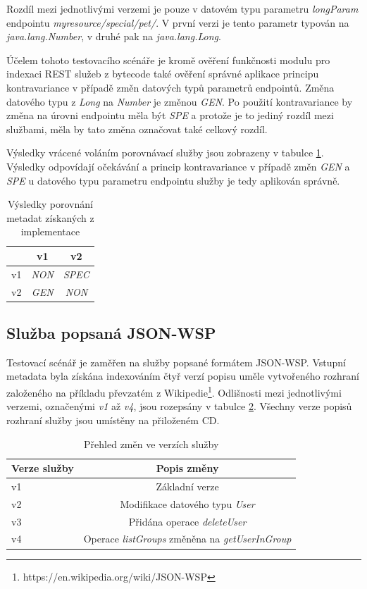 \documentclass[czech,DP]{thesiskiv}
\begin{document}
Rozdíl mezi jednotlivými verzemi je pouze v datovém typu parametru \textit{longParam} endpointu \textit{myresource/special/pet/}. V první verzi je tento parametr typován na \textit{java.lang.Number}, v druhé pak na \textit{java.lang.Long}.

Účelem tohoto testovacího scénáře je kromě ověření funkčnosti modulu pro indexaci REST služeb z bytecode také ověření správné aplikace principu kontravariance v případě změn datových typů parametrů endpointů. Změna datového typu z \textit{Long} na \textit{Number} je změnou \textit{GEN}. Po použití kontravariance by změna na úrovni endpointu měla být \textit{SPE} a protože je to jediný rozdíl mezi službami, měla by tato změna označovat také celkový rozdíl.

Výsledky vrácené voláním porovnávací služby jsou zobrazeny v tabulce \ref{tab:jersey-cmp-res}. Výsledky odpovídají očekávání a princip kontravariance v případě změn \textit{GEN} a \textit{SPE} u datového typu parametru endpointu služby je tedy aplikován správně.

\begin{table}[h]
	\centering
	\begin{tabular}{|l||c|c|}
		\hline
		& v1 & v2 \\
		\hline
		\hline
		v1 & \textit{NON} & \textit{SPEC} \\
		\hline
		v2 & \textit{GEN} & \textit{NON} \\
		\hline
	\end{tabular}
	\caption{Výsledky porovnání metadat získaných z implementace}
	\label{tab:jersey-cmp-res}
\end{table}
	
\subsection{Služba popsaná JSON-WSP}

Testovací scénář je zaměřen na služby popsané formátem JSON-WSP. Vstupní metadata byla získána indexováním čtyř verzí popisu uměle vytvořeného rozhraní založeného na příkladu převzatém z Wikipedie\footnote{https://en.wikipedia.org/wiki/JSON-WSP}. Odlišnosti mezi jednotlivými verzemi, označenými \textit{v1} až \textit{v4}, jsou rozepsány v tabulce \ref{tab:json-wsp-diffs}. Všechny verze popisů rozhraní služby jsou umístěny na přiloženém CD.

\begin{table}[h]
	\centering
	\begin{tabular}{|l|c|}
		\hline
		Verze služby & Popis změny \\
		\hline
		\hline
		v1 & Základní verze \\
		\hline
		v2 & Modifikace datového typu \textit{User} \\
		\hline
		v3 & Přidána operace \textit{deleteUser} \\
		\hline
		v4 & Operace \textit{listGroups} změněna na \textit{getUserInGroup} \\
		\hline
	\end{tabular}
	\caption{Přehled změn ve verzích služby}
	\label{tab:json-wsp-diffs}
\end{table}
\end{document}
